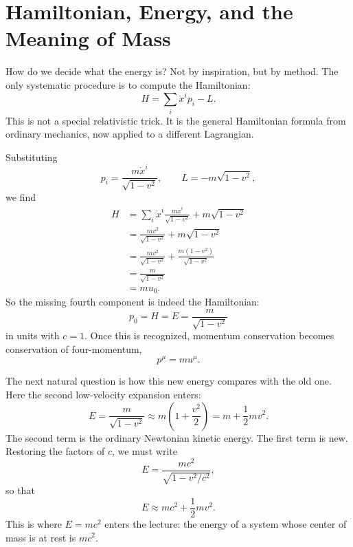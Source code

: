 \section{Hamiltonian, Energy, and the Meaning of Mass}

How do we decide what the energy is? Not by inspiration, but by method. The only systematic procedure is to compute the Hamiltonian:
\begin{equation}
H=\sum_i \dot x^i p_i-L.
\end{equation}
This is not a special relativistic trick. It is the general Hamiltonian formula from ordinary mechanics, now applied to a different Lagrangian.

Substituting
\begin{equation}
p_i=\frac{m\dot x^i}{\sqrt{1-v^2}},
\qquad
L=-m\sqrt{1-v^2},
\end{equation}
we find
\begin{align}
H
&=
\sum_i \dot x^i \frac{m\dot x^i}{\sqrt{1-v^2}} + m\sqrt{1-v^2} \\
&=
\frac{m v^2}{\sqrt{1-v^2}} + m\sqrt{1-v^2} \\
&=
\frac{m v^2}{\sqrt{1-v^2}} + \frac{m(1-v^2)}{\sqrt{1-v^2}} \\
&=
\frac{m}{\sqrt{1-v^2}} \\
&=
m u_0.
\end{align}
So the missing fourth component is indeed the Hamiltonian:
\begin{equation}
p_0 = H = E = \frac{m}{\sqrt{1-v^2}}
\end{equation}
in units with \(c=1\). Once this is recognized, momentum conservation becomes conservation of four-momentum,
\begin{equation}
p^\mu = m u^\mu.
\end{equation}

The next natural question is how this new energy compares with the old one. Here the second low-velocity expansion enters:
\begin{equation}
E
=
\frac{m}{\sqrt{1-v^2}}
\approx
m\left(1+\frac{v^2}{2}\right)
=
m+\frac12 mv^2.
\end{equation}
The second term is the ordinary Newtonian kinetic energy. The first term is new. Restoring the factors of \(c\), we must write
\begin{equation}
E=\frac{mc^2}{\sqrt{1-v^2/c^2}},
\end{equation}
so that
\begin{equation}
E\approx mc^2+\frac12 mv^2.
\end{equation}
This is where \(E=mc^2\) enters the lecture: the energy of a system whose center of mass is at rest is \(mc^2\).

